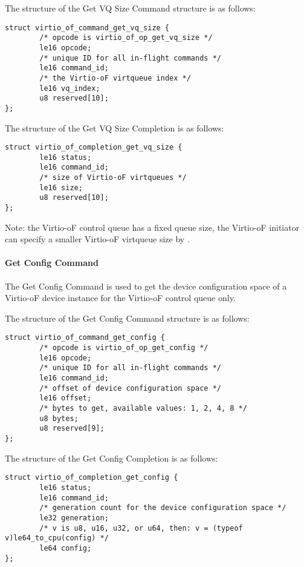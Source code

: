 The structure of the Get VQ Size Command structure is as follows:
\begin{lstlisting}
struct virtio_of_command_get_vq_size {
        /* opcode is virtio_of_op_get_vq_size */
        le16 opcode;
        /* unique ID for all in-flight commands */
        le16 command_id;
        /* the Virtio-oF virtqueue index */
        le16 vq_index;
        u8 reserved[10];
};
\end{lstlisting}

The structure of the Get VQ Size Completion is as follows:
\begin{lstlisting}
struct virtio_of_completion_get_vq_size {
        le16 status;
        le16 command_id;
        /* size of Virtio-oF virtqueues */
        le16 size;
        u8 reserved[10];
};
\end{lstlisting}

Note: the Virtio-oF control queue has a fixed queue size, the Virtio-oF initiator can specify a smaller Virtio-oF virtqueue size by
.

\paragraph{Get Config Command}\label{sec:Virtio Transport Options / Virtio Over Fabrics / Commands Definition / Opcodes / Get Config Command}
The Get Config Command is used to get the device configuration space of a Virtio-oF device instance for the Virtio-oF control queue only.

The structure of the Get Config Command structure is as follows:
\begin{lstlisting}
struct virtio_of_command_get_config {
        /* opcode is virtio_of_op_get_config */
        le16 opcode;
        /* unique ID for all in-flight commands */
        le16 command_id;
        /* offset of device configuration space */
        le16 offset;
        /* bytes to get, available values: 1, 2, 4, 8 */
        u8 bytes;
        u8 reserved[9];
};
\end{lstlisting}

The structure of the Get Config Completion is as follows:
\begin{lstlisting}
struct virtio_of_completion_get_config {
        le16 status;
        le16 command_id;
        /* generation count for the device configuration space */
        le32 generation;
        /* v is u8, u16, u32, or u64, then: v = (typeof v)le64_to_cpu(config) */
        le64 config;
};
\end{lstlisting}

